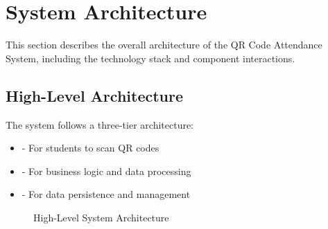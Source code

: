 \section{System Architecture}
\begin{infobox}
This section describes the overall architecture of the QR Code Attendance System, including the technology stack and component interactions.
\end{infobox}

\subsection{High-Level Architecture}
\textcolor{TextBlack}{
    The system follows a three-tier architecture:
    \begin{itemize}
        \item {} - For students to scan QR codes
        \item {} - For business logic and data processing
        \item {} - For data persistence and management
    \end{itemize}
}

\begin{figure}[h]
    \centering
    \caption{High-Level System Architecture}
\end{figure}

